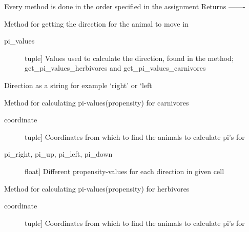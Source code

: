 \documentclass[a4paper,10pt,english]{sphinxmanual}
\begin{document}
\begin{fulllineitems}
\begin{fulllineitems}
Every method is done in the order specified in the assignment
Returns
-------

\end{fulllineitems}


\begin{fulllineitems}
\label{\detokenize{island:biosim.island.Island.get_direction}}
Method for getting the direction for the animal to move in
\begin{description}
\item[{pi\_values}] \leavevmode{[}tuple{]}
Values used to calculate the direction, found in the method;
get\_pi\_values\_herbivores and get\_pi\_values\_carnivores

\end{description}

Direction as a string for example `right' or `left

\end{fulllineitems}


\begin{fulllineitems}
\label{\detokenize{island:biosim.island.Island.get_pi_values_carnivores}}
Method for calculating pi-values(propensity) for carnivores
\begin{description}
\item[{coordinate}] \leavevmode{[}tuple{]}
Coordinates  from which to find the animals to calculate pi's for

\end{description}
\begin{description}
\item[{pi\_right, pi\_up, pi\_left, pi\_down}] \leavevmode{[}float{]}
Different propensity-values for each direction in given cell

\end{description}

\end{fulllineitems}


\begin{fulllineitems}
\label{\detokenize{island:biosim.island.Island.get_pi_values_herbivores}}
Method for calculating pi-values(propensity) for herbivores
\begin{description}
\item[{coordinate}] \leavevmode{[}tuple{]}
Coordinates  from which to find the animals to calculate pi's for


\end{description}
\end{fulllineitems}
\end{fulllineitems}
\end{document}
